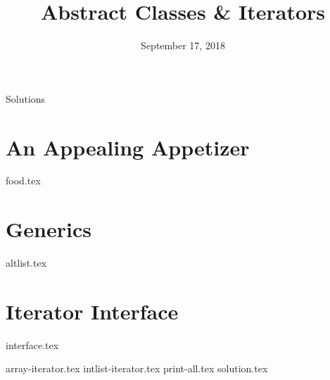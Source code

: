 \documentclass[11pt]{exam}
\title{Abstract Classes \& Iterators}
\date{September 17, 2018}
\begin{document}
\maketitle
\begin{solution}\huge{Solutions}\end{solution}

\section{An Appealing Appetizer}
\begin{questions}
{food.tex}
\end{questions}
\clearpage

\section{Generics}
\begin{questions}
{altlist.tex}
\end{questions}
\clearpage

\section{Iterator Interface}
{interface.tex}
\begin{questions}
{array-iterator.tex}
\clearpage
{intlist-iterator.tex}
{print-all.tex}
{solution.tex}
\end{questions}
\end{document}
